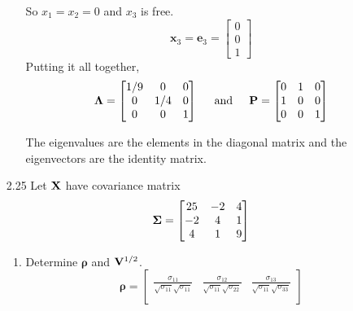 \begin{enumerate}[font=\bfseries]
\begin{enumerate}
\[            \]
            So $x_1 = x_2 = 0$ and $x_3$ is free.
            \[
                \mathbf{x}_3
                =
                \mathbf{e}_3
                =
                \begin{bmatrix}
                    0 \\
                    0 \\
                    1
                \end{bmatrix}
            \]
            Putting it all together,
            \[
                \mathbf{\Lambda}
                =
                \begin{bmatrix}
                    1/9 & 0 & 0 \\
                    0 & 1/4 & 0 \\
                    0 & 0 & 1
                \end{bmatrix}
                \hspace{0.2in}\text{and}\hspace{0.2in}
                \mathbf{P}
                =
                \begin{bmatrix}
                    0 & 1 & 0 \\
                    1 & 0 & 0 \\
                    0 & 0 & 1
                \end{bmatrix}
            \]
            \par
            The eigenvalues are the elements in the diagonal matrix and the eigenvectors are the identity matrix.
        \end{enumerate}
        \item[2.25] Let $\bold{X}$ have covariance matrix
        \[
            \bold{\Sigma}
            =
            \begin{bmatrix}
                25 & -2 & 4 \\
                -2 & 4 & 1 \\
                4 & 1 & 9
            \end{bmatrix}
        \]
        \begin{enumerate}
            \item Determine $\bm{\rho}$ and $\bold{V}^{1/2}$.
            \[
                \bm{\rho}
                =
                \begin{bmatrix}
                    \frac{\sigma_{11}}{\sqrt{\sigma_{11}}\sqrt{\sigma_{11}}} & \frac{\sigma_{12}}{\sqrt{\sigma_{11}}\sqrt{\sigma_{22}}} & \frac{\sigma_{13}}{\sqrt{\sigma_{11}}\sqrt{\sigma_{33}}} \\

\end{bmatrix}\]
\end{enumerate}
\end{enumerate}
